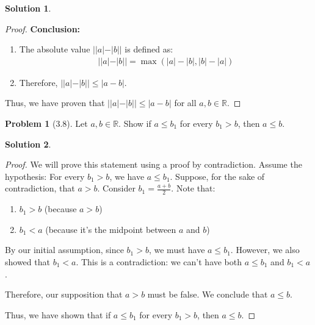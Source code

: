 \documentclass[12pt]{article}
\theoremstyle{definition} %
\newtheorem{solution}{Solution}
\newtheorem{problem}{Problem}
\theoremstyle{plain} %
\begin{document}
\begin{solution}
\begin{proof}
              \textbf{Conclusion:}
              \begin{enumerate}
                  \item The absolute value $||a| - |b||$ is defined as:
                  \begin{align}
                  ||a| - |b|| = \max(|a| - |b|, |b| - |a|)
                  \end{align}
                  \item Therefore, $||a| - |b|| \leq |a - b|$.
              \end{enumerate}
  
          
          Thus, we have proven that $||a|-|b||\leq|a-b|$ for all $a,b \in \mathbb{R}$. 
      \end{proof}
  
  \end{solution}
  
  
  
  
  
  
  
  \begin{problem}[3.8]
   Let $a,b \in \mathbb{R}$. Show if $a\leq b_{1}$ for every $b_{1} > b$, then $a\leq b$.
     
  \end{problem}
  
  \begin{solution}
      \begin{proof}
       We will prove this statement using a proof by contradiction.
           Assume the hypothesis: For every $b_1 > b$, we have $a \leq b_1$.
           Suppose, for the sake of contradiction, that $a > b$.
           Consider $b_1 = \frac{a + b}{2}$. Note that:
          \begin{enumerate}
              \item $b_1 > b$ (because $a > b$)
              \item $b_1 < a$ (because it's the midpoint between $a$ and $b$)
          \end{enumerate}
          By our initial assumption, since $b_1 > b$, we must have $a \leq b_1$.
          However, we also showed that $b_1 < a$.
           This is a contradiction: we can't have both $a \leq b_1$ and $b_1 < a$.
  
      
      Therefore, our supposition that $a > b$ must be false. We conclude that $a \leq b$.
      
      Thus, we have shown that if $a \leq b_1$ for every $b_1 > b$, then $a \leq b$. 
      \end{proof}
      \end{solution}
  
\end{document}
